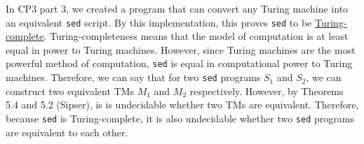 \documentclass{article}
\begin{document}
\begin{enumerate}[(a)]
            In CP3 part 3, we created a program that can convert any Turing machine into an equivalent \texttt{sed} script. By this implementation, this proves \texttt{sed} to be \href{https://en.wikipedia.org/wiki/Turing_completeness}{Turing-complete}. Turing-completeness means that the model of computation is at least equal in power to Turing machines. However, since Turing machines are the most powerful method of computation, \texttt{sed} is equal in computational power to Turing machines. Therefore, we can say that for two \texttt{sed} programs $S_1$ and $S_2$, we can construct two equivalent TMs $M_1$ and $M_2$ respectively. However, by Theorems 5.4 and 5.2 (Sipser), is is undecidable whether two TMs are equivalent. Therefore, because \texttt{sed} is Turing-complete, it is also undecidable whether two \texttt{sed} programs are equivalent to each other.

    \end{enumerate}
\end{document}
